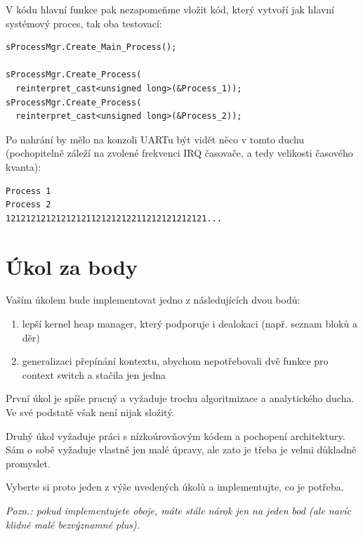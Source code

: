 \documentclass{article}
\begin{document}
V kódu hlavní funkce pak nezapomeňme vložit kód, který vytvoří jak hlavní systémový proces, tak oba testovací:
\begin{lstlisting}
sProcessMgr.Create_Main_Process();

sProcessMgr.Create_Process(
  reinterpret_cast<unsigned long>(&Process_1));
sProcessMgr.Create_Process(
  reinterpret_cast<unsigned long>(&Process_2));
\end{lstlisting}

Po nahrání by mělo na konzoli UARTu být vidět něco v tomto duchu (pochopitelně záleží na zvolené frekvenci IRQ časovače, a tedy velikosti časového kvanta):

\begin{verbatim}
Process 1
Process 2
1212121212121212112121212211212121212121...
\end{verbatim}




\section{Úkol za body}

Vaším úkolem bude implementovat jedno z následujících dvou bodů:

\begin{enumerate}
	\item lepší kernel heap manager, který podporuje i dealokaci (např. seznam bloků a děr)
	\item generalizaci přepínání kontextu, abychom nepotřebovali dvě funkce pro context switch a stačila jen jedna
\end{enumerate}

První úkol je spíše pracný a vyžaduje trochu algoritmizace a analytického ducha. Ve své podstatě však není nijak složitý.

Druhý úkol vyžaduje práci s nízkoúrovňovým kódem a pochopení architektury. Sám o sobě vyžaduje vlastně jen malé úpravy, ale zato je třeba je velmi důkladně promyslet.

Vyberte si proto jeden z výše uvedených úkolů a implementujte, co je potřeba.

\emph{Pozn.: pokud implementujete oboje, máte stále nárok jen na jeden bod (ale navíc klidně malé bezvýznamné plus).}
\end{document}

